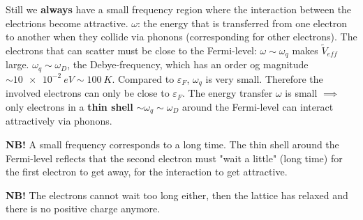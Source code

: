Still we \textbf{always} have a small frequency region where the interaction between the electrions become attractive. $\omega$: the energy that is transferred from one electron to another when they collide via phonons (corresponding for other electrons). The electrons that can scatter must be close to the Fermi-level: $\omega\sim\omega_q$ makes $\tilde{V}_{eff}$ large. $\omega_q\sim\omega_D$, the Debye-frequency, which has an order og magnitude $\sim\SI{10e-2}{eV}\sim\SI{100}{K}$. Compared to $\varepsilon_F$, $\omega_q$ is very small. Therefore the involved electrons can only be close to $\varepsilon_F$. The energy transfer $\omega$ is small $\implies$ only electrons in a \textbf{thin shell} $\sim\omega_q\sim\omega_D$ around the Fermi-level can interact attractively via phonons.

\begin{Indentskip}
	\vspace*{-0.5\baselineskip}
	\textbf{NB!} A small frequency corresponds to a long time. The thin shell around the Fermi-level reflects that the second electron must "wait a little" (long time) for the first electron to get away, for the interaction to get attractive.
\end{Indentskip}
\begin{Indentskip}
	\vspace*{-0.5\baselineskip}
	\textbf{NB!} The electrons cannot wait too long either, then the lattice has relaxed and there is no positive charge anymore.
\end{Indentskip}

